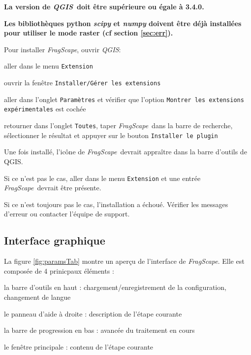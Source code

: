 \documentclass[11pt]{article}
\newcommand{\tool}{\emph{FragScape}}
\newcommand{\qgis}{\emph{QGIS}}
\let\tempone\itemize
\let\temptwo\enditemize
\renewenvironment{itemize}{\tempone\addtolength{\itemsep}{-0.5\baselineskip}}{\temptwo}
\renewenvironment{enumerate}{\tempone\addtolength{\itemsep}{-0.5\baselineskip}}{\temptwo}
\begin{document}
\begin{itemize}
    \item \textbf{\color{red}La version de \qgis\ doit être supérieure ou égale à 3.4.0.}
    \item \textbf{\color{red}Les bibliothèques python \emph{scipy} et \emph{numpy} doivent être déjà installées pour utiliser le mode raster (cf section \ref{sec:err}).}
\end{itemize}
\frameboxend

Pour installer \tool, ouvrir \qgis:
\begin{enumerate}
    \item aller dans le menu \texttt{Extension}
    \item ouvrir la fenêtre \texttt{Installer/Gérer les extensions}
    \item aller dans l'onglet \texttt{Paramètres} et vérifier que l'option \texttt{Montrer les extensions expérimentales} est cochée
    \item retourner dans l'onglet \texttt{Toutes}, taper \tool\ dans la barre de recherche, sélectionner le résultat et appuyer sur le bouton \texttt{Installer le plugin}
\end{enumerate}

Une fois installé, l'icône  de \tool\ devrait appraître dans la barre d'outils de QGIS.

Si ce n'est pas le cas, aller dans le menu \texttt{Extension} et une entrée \tool\ devrait être présente.

Si ce n'est toujours pas le cas, l'installation a échoué. Vérifier les messages d'erreur ou contacter l'équipe de support.

\subsection{Interface graphique}

La figure \ref{fig:paramsTab} montre un aperçu de l'interface de \tool. Elle est composée de 4 prinicpaux éléments :
\begin{itemize}
    \item la barre d'outils en haut : chargement/enregistrement de la configuration, changement de langue 
    \item le panneau d'aide à droite : description de l'étape courante
    \item la barre de progression en bas : avancée du traitement en cours
    \item le fenêtre principale : contenu de l'étape courante
\end{itemize}
\end{document}
